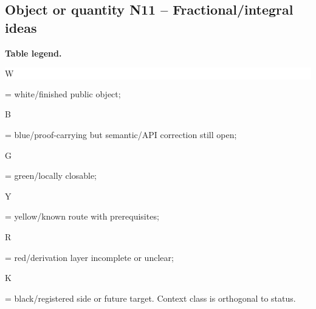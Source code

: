 \subsection*{Object or quantity N11 -- Fractional/\allowbreak{}integral ideas}
\hypertarget{objproof:N11}{}
\par\smallskip\noindent\begin{minipage}{0.99\linewidth}\footnotesize\raggedright\textbf{Table legend.} \colorbox{white}{\strut W} = white/finished public object; \colorbox{cyan!20}{\strut B} = blue/proof-carrying but semantic/API correction still open; \colorbox{green!18}{\strut G} = green/locally closable; \colorbox{yellow!25}{\strut Y} = yellow/known route with prerequisites; \colorbox{red!20}{\strut R} = red/derivation layer incomplete or unclear; \colorbox{black!18}{\strut K} = black/registered side or future target. Context class is orthogonal to status.\end{minipage}\par\vspace{0.25em}
